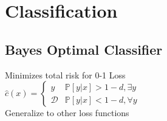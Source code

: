 \section*{Classification}




\subsection*{Bayes Optimal Classifier}
Minimizes total risk for 0-1 Loss\\
$\hat{c}(x){=}
\begin{cases} 
       y & \mathbb{P}[y|x]>{1-d},\exists y\\
       \mathcal{D} & \mathbb{P}[y|x]<1-d,\forall y
   \end{cases}
 $\\
 Generalize to other loss functions

